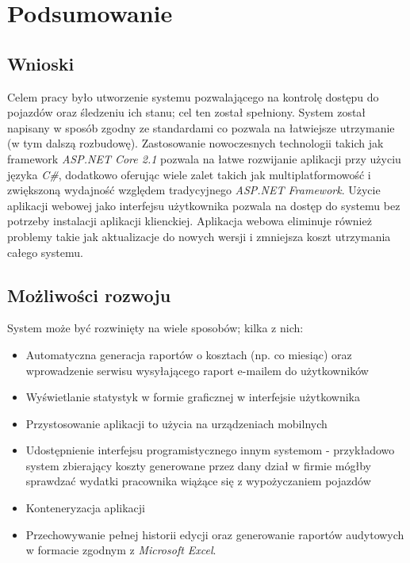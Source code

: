 \documentclass[eng,printmode,openany]{mgr}
\begin{document}
\newpage
\chapter{Podsumowanie}
\section{Wnioski}
Celem pracy było utworzenie systemu pozwalającego na kontrolę dostępu do pojazdów oraz śledzeniu ich stanu; cel ten został spełniony. System został napisany w sposób zgodny ze standardami co pozwala na łatwiejsze utrzymanie (w tym dalszą rozbudowę). Zastosowanie nowoczesnych technologii takich jak framework \textit{ASP.NET Core 2.1} pozwala na łatwe rozwijanie aplikacji przy użyciu języka \textit{C\#}, dodatkowo oferując wiele zalet takich jak multiplatformowość i zwiększoną wydajność względem tradycyjnego \textit{ASP.NET Framework}. Użycie aplikacji webowej jako interfejsu użytkownika pozwala na dostęp do systemu bez potrzeby instalacji aplikacji klienckiej. Aplikacja webowa eliminuje również problemy takie jak aktualizacje do nowych wersji i zmniejsza koszt utrzymania całego systemu.

\section{Możliwości rozwoju}
System może być rozwinięty na wiele sposobów; kilka z nich:
\begin{itemize}
	\item Automatyczna generacja raportów o kosztach (np. co miesiąc) oraz wprowadzenie serwisu wysyłającego raport e-mailem do użytkowników 
	\item Wyświetlanie statystyk w formie graficznej w interfejsie użytkownika
	\item Przystosowanie aplikacji to użycia na urządzeniach mobilnych
	\item Udostępnienie interfejsu programistycznego innym systemom - przykładowo system zbierający koszty generowane przez dany dział w firmie mógłby sprawdzać wydatki pracownika wiążące się z wypożyczaniem pojazdów
	\item Konteneryzacja aplikacji
	\item Przechowywanie pełnej historii edycji oraz generowanie raportów audytowych w formacie zgodnym z \textit{Microsoft Excel}.
\end{itemize}
\end{document}
